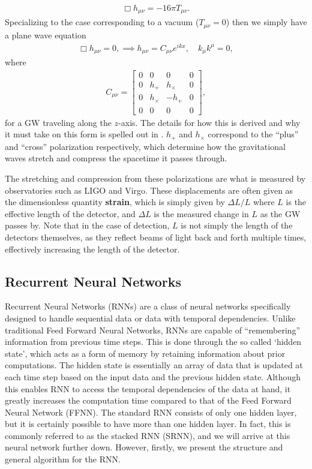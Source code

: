 \documentclass[%
reprint,
amsmath,amssymb,
aps,
]{revtex4-2}
\begin{document}
\begin{align}
	\Box h_{\mu\nu}=-16\pi T_{\mu\nu}.
\end{align}
Specializing to the case corresponding to a vacuum ($T_{\mu\nu}=0$) then we simply have a plane wave equation
\begin{align}
	\Box h_{\mu\nu}=0,\implies h_{\mu\nu}=C_{\mu\nu}e^{ikx},\quad k_\mu k^\mu=0,
\end{align}
where
\begin{align}
	C_{\mu\nu}=\begin{bmatrix}
		0&0&0&0\\
		0&h_+&h_\times&0\\
		0&h_\times&-h_+&0\\
		0&0&0&0
	\end{bmatrix},
\end{align}
for a GW traveling along the $z$-axis. The details for how this is derived and why it must take on this form is spelled out in \cite{Carroll}. $h_+$ and $h_\times$ correspond to the ``plus'' and ``cross'' polarization respectively, which determine how the gravitational waves stretch and compress the spacetime it passes through. 

The stretching and compression from these polarizations are what is measured by observatories such as LIGO and Virgo. These displacements are often given as the dimensionless quantity \textbf{strain}, which is simply given by $\Delta L/L$ where $L$ is the effective length of the detector, and $\Delta L$ is the measured change in $L$ as the GW passes by. Note that in the case of detection, $L$ is not simply the length of the detectors themselves, as they reflect beams of light back and forth multiple times, effectively increasing the length of the detector.


\subsection{Recurrent Neural Networks}
\label{sec:RNNs}
Recurrent Neural Networks (RNNs) are a class of neural networks specifically designed to handle sequential data or data with temporal dependencies. Unlike traditional Feed Forward Neural Networks, RNNs are capable of ``remembering'' information from previous time steps. This is done through the so called `hidden state', which acts as a form of memory by retaining information about prior computations. The hidden state is essentially an array of data that is updated at each time step based on the input data and the previous hidden state. Although this enables RNN to access the temporal dependencies of the data at hand, it greatly increases the computation time compared to that of the Feed Forward Neural Network (FFNN). The standard RNN consists of only one hidden layer, but it is certainly possible to have more than one hidden layer. In fact, this is commonly referred to as the stacked RNN (SRNN), and we will arrive at this neural network further down. However, firstly, we present the structure and general algorithm for the RNN.
\end{document}
